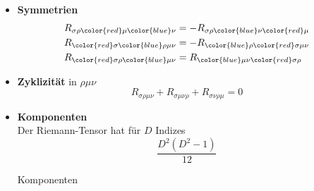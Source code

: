 \documentclass{article}
\begin{document}
\begin{itemize}
	\item \textbf{Symmetrien}
		\begin{align}
			R_{\sigma\rho{\color{red}\mu}{\color{blue}\nu}} &= -R_{\sigma\rho{\color{blue}\nu}{\color{red}\mu}} \\
			R_{{\color{red}\sigma}{\color{blue}\rho}\mu\nu} &= -R_{{\color{blue}\rho}{\color{red}\sigma}\mu\nu} \\
			R_{{\color{red}\sigma\rho}{\color{blue}\mu\nu}} &= R_{{\color{blue}\mu\nu}{\color{red}\sigma\rho}}
		\end{align}

		\item \textbf{Zyklizität} in $\rho\mu\nu$
			\begin{equation}
				R_{\sigma\rho\mu\nu} + R_{\sigma\mu\nu\rho} + R_{\sigma\nu\rho\mu} = 0
			\end{equation}
			
		\item \textbf{Komponenten}\\
		Der Riemann-Tensor hat für $D$ Indizes
			$$\frac{D^2(D^2-1)}{12}$$

		Komponenten
\end{itemize}
\end{document}
